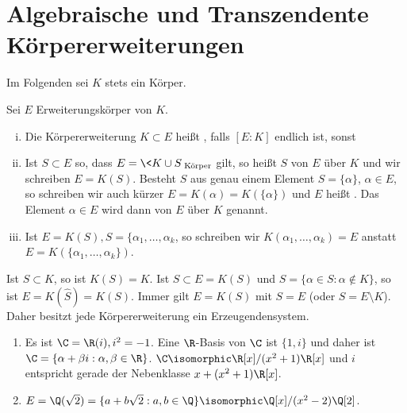 \section{Algebraische und Transzendente Körpererweiterungen}


Im Folgenden sei $K$ stets ein Körper.

\begin{df} \label{18.3-1}
	Sei $E$ Erweiterungskörper von $K$.
	\begin{enumerate}[i)]
		\item
			Die Körpererweiterung $K \subset E$ heißt , falls $[E : K]$ endlich ist, sonst 
		\item
			Ist $S \subset E$ so, dass $E = \<K \cup S\>_{\text{Körper}}$ gilt, so heißt $S$  von $E$ über $K$ und wir schreiben $E = K(S)$.
			Besteht $S$ aus genau einem Element $S = \{ \alpha \}$, $\alpha \in E$, so schreiben wir auch kürzer $E = K(\alpha) = K(\{\alpha\})$ und $E$ heißt .
			Das Element $\alpha \in E$ wird dann  von $E$ über $K$ genannt.
		\item
			Ist $E = K(S), S = \{\alpha_1, \dotsc, \alpha_k$, so schreiben wir $K(\alpha_1, \dotsc, \alpha_k) = E$ anstatt $E = K(\{\alpha_1, \dotsc, \alpha_k\})$.
	\end{enumerate}
\end{df}

\begin{note}
	Ist $S \subset K$, so ist $K(S) = K$.
	Ist $S \subset E = K(S)$ und $\hat S = \{ \alpha \in S : \alpha \not\in K\}$, so ist $E = K(\hat S) = K(S)$.
	Immer gilt $E = K(S)$ mit $S = E$ (oder $S = E \setminus K$).
	Daher besitzt jede Körpererweiterung ein Erzeugendensystem.
\end{note}

\begin{ex*}
	\begin{enumerate}[1.)]
		\item
			Es ist $\C = \R(i), i^2 = -1$.
			Eine $\R$-Basis von $\C$ ist $\{1, i\}$ und daher ist $\C = \{ \alpha + \beta i : \alpha, \beta \in \R\}$.
			$\C \isomorphic \R[x] / (x^2+1) \R[x]$ und $i$ entspricht gerade der Nebenklasse $x + (x^2+1)\R[x]$.
		\item
			$E = \Q(\sqrt 2) = \{ a + b \sqrt 2 : a,b \in \Q \} \isomorphic \Q[x] / (x^2 - 2) \Q[2]$.
	\end{enumerate}
\end{ex*}

